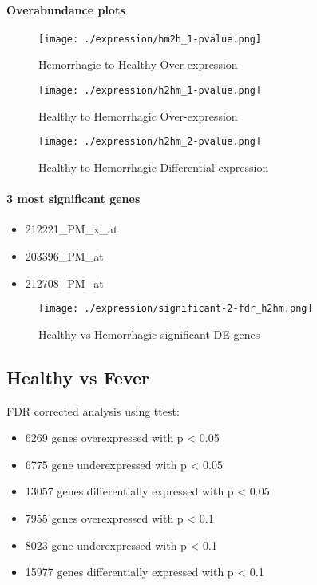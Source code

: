 \documentclass[a4paper]{article}
\begin{document}
\paragraph{Overabundance plots}

\begin{figure}
  \texttt{[image: ./expression/hm2h\_1-pvalue.png]}
  \caption{Hemorrhagic to Healthy Over-expression}
\end{figure}

\begin{figure}
  \texttt{[image: ./expression/h2hm\_1-pvalue.png]}
  \caption{Healthy to Hemorrhagic Over-expression}
\end{figure}

\begin{figure}
  \texttt{[image: ./expression/h2hm\_2-pvalue.png]}
  \caption{Healthy to Hemorrhagic Differential expression}
\end{figure}

\paragraph{3 most significant genes}

\begin{itemize}
  \item 212221\_PM\_x\_at
  \item 203396\_PM\_at
  \item 212708\_PM\_at
\end{itemize}

\begin{figure}
  \texttt{[image: ./expression/significant-2-fdr\_h2hm.png]}
  \caption{Healthy vs Hemorrhagic significant DE genes}
\end{figure}

\clearpage
\subsection{Healthy vs Fever}

FDR corrected analysis using ttest:

\begin{itemize}
  \item 6269 genes overexpressed with p < 0.05
  \item 6775 gene underexpressed with p < 0.05
  \item 13057 genes differentially expressed with p < 0.05
  \item 7955 genes overexpressed with p < 0.1
  \item 8023 gene underexpressed with p < 0.1
  \item 15977 genes differentially expressed with p < 0.1
\end{itemize}
\end{document}
